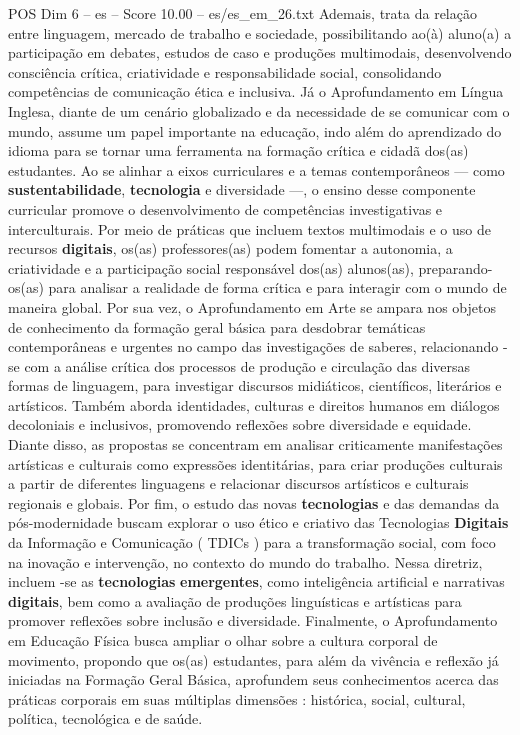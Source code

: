 \begin{textsample}{POS Dim 6 – es – Score 10.00 – es/es\_em\_26.txt}
Ademais, trata da relação entre linguagem, mercado de trabalho e sociedade, possibilitando ao(à) aluno(a) a participação em debates, estudos de caso e produções multimodais, desenvolvendo consciência crítica, criatividade e responsabilidade social, consolidando competências de comunicação ética e inclusiva.
Já o Aprofundamento em Língua Inglesa, diante de um cenário globalizado e da necessidade de se comunicar com o mundo, assume um papel importante na educação, indo além do aprendizado do idioma para se tornar uma ferramenta na formação crítica e cidadã dos(as) estudantes.
Ao se alinhar a eixos curriculares e a temas contemporâneos — como \textbf{sustentabilidade}, \textbf{tecnologia} e diversidade —, o ensino desse componente curricular promove o desenvolvimento de competências investigativas e interculturais.
Por meio de práticas que incluem textos multimodais e o uso de recursos \textbf{digitais}, os(as) professores(as) podem fomentar a autonomia, a criatividade e a participação social responsável dos(as) alunos(as), preparando-os(as) para analisar a realidade de forma crítica e para interagir com o mundo de maneira global.
Por sua vez, o Aprofundamento em Arte se ampara nos objetos de conhecimento da formação geral básica para desdobrar temáticas contemporâneas e urgentes no campo das investigações de saberes, relacionando -se com a análise crítica dos processos de produção e circulação das diversas formas de linguagem, para investigar discursos midiáticos, científicos, literários e artísticos.
Também aborda identidades, culturas e direitos humanos em diálogos decoloniais e inclusivos, promovendo reflexões sobre diversidade e equidade.
Diante disso, as propostas se concentram em analisar criticamente manifestações artísticas e culturais como expressões identitárias, para criar produções culturais a partir de diferentes linguagens e relacionar discursos artísticos e culturais regionais e globais.
Por fim, o estudo das novas \textbf{tecnologias} e das demandas da pós-modernidade buscam explorar o uso ético e criativo das Tecnologias \textbf{Digitais} da Informação e Comunicação ( TDICs ) para a transformação social, com foco na inovação e intervenção, no contexto do mundo do trabalho.
Nessa diretriz, incluem -se as \textbf{tecnologias} \textbf{emergentes}, como inteligência artificial e narrativas \textbf{digitais}, bem como a avaliação de produções linguísticas e artísticas para promover reflexões sobre inclusão e diversidade.
Finalmente, o Aprofundamento em Educação Física busca ampliar o olhar sobre a cultura corporal de movimento, propondo que os(as) estudantes, para além da vivência e reflexão já iniciadas na Formação Geral Básica, aprofundem seus conhecimentos acerca das práticas corporais em suas múltiplas dimensões : histórica, social, cultural, política, tecnológica e de saúde.

\end{textsample}
